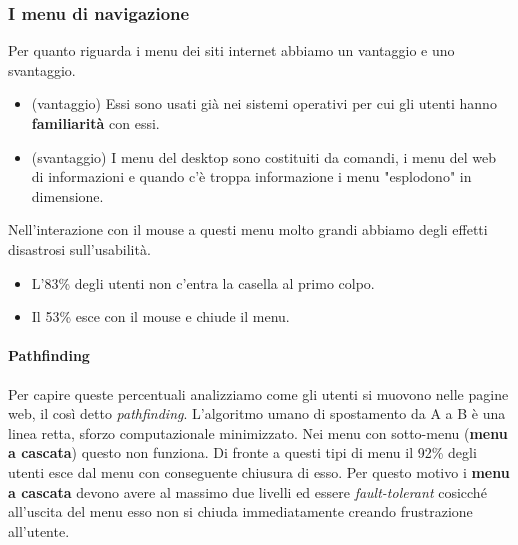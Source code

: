 		\subsubsection{I menu di navigazione}
			Per quanto riguarda i menu dei siti internet abbiamo un vantaggio e uno svantaggio.
			\begin{itemize}
				\item (vantaggio) Essi sono usati già nei sistemi operativi per cui gli utenti hanno \textbf{familiarità} con essi.
				\item (svantaggio) I menu del desktop sono costituiti da comandi, i menu del web di informazioni e quando c'è troppa informazione i menu "esplodono" in dimensione.
			\end{itemize}
			Nell'interazione con il mouse a questi menu molto grandi abbiamo degli effetti disastrosi sull'usabilità.
			\begin{itemize}
				\item L'83\% degli utenti non c'entra la casella al primo colpo.
				\item Il 53\% esce con il mouse e chiude il menu.
			\end{itemize}

			\paragraph{Pathfinding}
				Per capire queste percentuali analizziamo come gli utenti si muovono nelle pagine web, il così detto \emph{pathfinding}. L'algoritmo umano di spostamento da A a B è una linea retta, sforzo computazionale minimizzato. Nei menu con sotto-menu (\textbf{menu a cascata}) questo non funziona. Di fronte a questi tipi di menu il 92\% degli utenti esce dal menu con conseguente chiusura di esso. Per questo motivo i \textbf{menu a cascata} devono avere al massimo due livelli ed essere \emph{fault-tolerant} cosicché all'uscita del menu esso non si chiuda immediatamente creando frustrazione all'utente.
			

